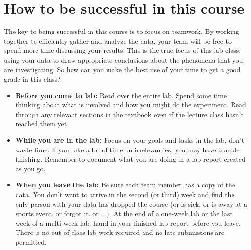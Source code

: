 \section*{How to be successful in this course}
The key to being successful in this course is to focus on teamwork.
By working together to efficiently gather and analyze the data, your team will be free to spend more time discussing your results.
This is the true focus of this lab class: using your data to draw appropriate conclusions about the phenomena that you are investigating.
So how can you make the best use of your time to get a good grade in this class?
\begin{itemize}
	\setlength\itemsep{2pt}
	\item \textbf{Before you come to lab:} Read over the entire lab.
	Spend some time thinking about what is involved and how you might do the experiment.
	Read through any relevant sections in the textbook even if the lecture class hasn't reached them yet.
	\item \textbf{While you are in the lab:} Focus on your goals and tasks in the lab, don’t waste time.
	If you take a lot of time on irrelevancies, you may have trouble finishing.
	Remember to document what you are doing in a lab report created as you go.
	\item \textbf{When you leave the lab:} Be sure each team member has a copy of the data.
	You don’t want to arrive in the second (or third) week and find the only person with your data has dropped the course (or is sick, or is away at a sports event, or forgot it, or ...).
	At the end of a one-week lab or the last week of a multi-week lab, hand in your finished lab report before you leave.
	There is no out-of-class lab work required and no late-submissions are permitted.
\end{itemize}

